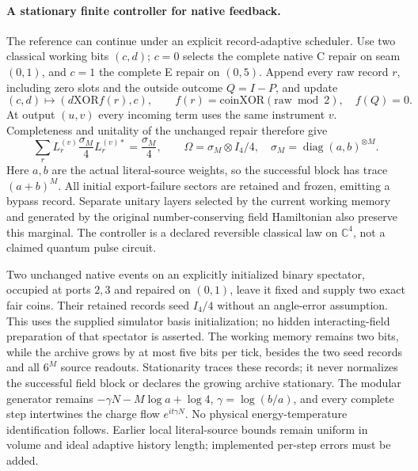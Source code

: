 \paragraph{A stationary finite controller for native feedback.}
The reference can continue under an explicit record-adaptive scheduler.
Use two classical working bits $(c,d)$; $c=0$ selects the complete native C
repair on seam $(0,1)$, and $c=1$ the complete E repair on $(0,5)$.
Append every raw record $r$, including zero slots and the outside outcome
$Q=I-P$, and update
\[
 (c,d)\longmapsto(d\mathbin{\mathrm{XOR}}f(r),c),\qquad
 f(r)=\mathrm{coin}\mathbin{\mathrm{XOR}}(\mathrm{raw}\bmod2),
 \quad f(Q)=0.
\]
At output $(u,v)$ every incoming term uses the same instrument $v$.
Completeness and unitality of the unchanged repair therefore give
\[
 \sum_r L_r^{(v)}\frac{\sigma_M}{4}L_r^{(v)*}
 =\frac{\sigma_M}{4},\qquad
 \Omega=\sigma_M\otimes I_4/4,
 \quad\sigma_M=\operatorname{diag}(a,b)^{\otimes M}.
\]
Here $a,b$ are the actual literal-source weights, so the successful block
has trace $(a+b)^M$. All initial export-failure sectors are retained
and frozen, emitting a bypass record. Separate unitary layers selected by
the current working memory and generated by the original number-conserving
field Hamiltonian also preserve this marginal. The controller is a declared
reversible classical law on $\mathbb C^4$, not a claimed quantum pulse circuit.

Two unchanged native events on an explicitly initialized binary spectator,
occupied at ports $2,3$ and repaired on $(0,1)$, leave it fixed and supply two
exact fair coins. Their retained records seed $I_4/4$ without an angle-error
assumption. This uses the supplied simulator basis initialization; no hidden
interacting-field preparation of that spectator is asserted. The working
memory remains two bits, while the archive grows by at most five bits per
tick, besides the two seed records and all $6^M$ source readouts. Stationarity
traces these records; it never normalizes the successful field block or
declares the growing archive stationary. The modular generator remains
$-\gamma N-M\log a+\log4$, $\gamma=\log(b/a)$, and every complete step
intertwines the charge flow $e^{it\gamma N}$. No physical energy-temperature
identification follows. Earlier local literal-source bounds remain uniform
in volume and ideal adaptive history length; implemented per-step errors
must be added.

